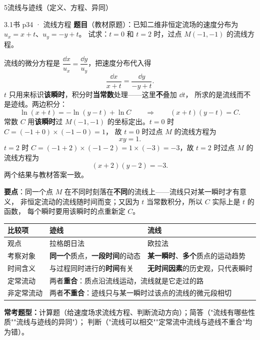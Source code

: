 \begin{kaodian}{5}{流线与迹线（定义、方程、异同）}
\begin{liti}{3.1}{书 p34 · 流线方程}
\textbf{题目}（教材原题）：已知二维非恒定流场的速度分布为 $u_x=x+t$、$u_y=-y+t$。
试求：$t=0$ 和 $t=2$ 时，过点 $M(-1,-1)$ 的流线方程。

\begin{jie}
流线的微分方程是 $\dfrac{\dd x}{u_x}=\dfrac{\dd y}{u_y}$，把速度分布代入得
\[
\frac{\dd x}{x+t}=\frac{\dd y}{-y+t}.
\]
$t$ 只用来标识\textbf{该瞬时}，积分时\textbf{当常数}处理——这里\textbf{不}叠加 $\dd t$，
所求的是流线而不是迹线。两边积分：
\[
\ln(x+t)=-\ln(y-t)+\ln C
\qquad\Longrightarrow\qquad
(x+t)(y-t)=C .
\]
常数 $C$ 用\textbf{该瞬时}过 $M(-1,-1)$ 的坐标定出。$t=0$ 时 $C=(-1+0)\times(-1-0)=1$，
故 $t=0$ 时过点 $M$ 的流线方程为
\[
xy=1 .
\]
$t=2$ 时 $C=(-1+2)\times(-1-2)=1\times(-3)=-3$，故 $t=2$ 时过点 $M$ 的流线方程为
\[
(x+2)(y-2)=-3 .
\]
两个结果与教材答案一致。

\textbf{要点}：同一个点 $M$ 在不同时刻落在\textbf{不同}的流线上——流线只对某一瞬时才有意义，
非恒定流动的流线随时间而变；又因为 $t$ 当常数积分，所以 $C$ 实际上是 $t$ 的函数，
每个瞬时要用该瞬时的点重新定 $C$。

\end{jie}
\end{liti}

\begin{center}
\begin{tabularx}{\textwidth}{@{}lXX@{}}
\toprule
比较项 & 迹线 & 流线 \\
\midrule
观点 & 拉格朗日法 & 欧拉法 \\
考察对象 & \textbf{同一个}质点，\textbf{一段时间}的动态 & \textbf{某一瞬时}、\textbf{多个}质点的运动趋势 \\
时间含义 & 与过程同时进行的\textbf{时间}有关 & \textbf{无时间因素}的历史观，只代表瞬时 \\
定常流动 & \multicolumn{2}{l}{两者\textbf{重合}：质点沿流线运动，流线就是它走过的路} \\
非定常流动 & \multicolumn{2}{l}{两者\textbf{不重合}：迹线只与某一瞬时过该点的流线的微元段相切} \\
\bottomrule
\end{tabularx}
\end{center}

\textbf{常考题型：}计算题（给速度场求流线方程、判断流动方向）；简答（"流线有哪些性质""流线与迹线的异同"）；
判断（"流线可以相交""定常流中流线与迹线不重合"均为错）。


\end{kaodian}

